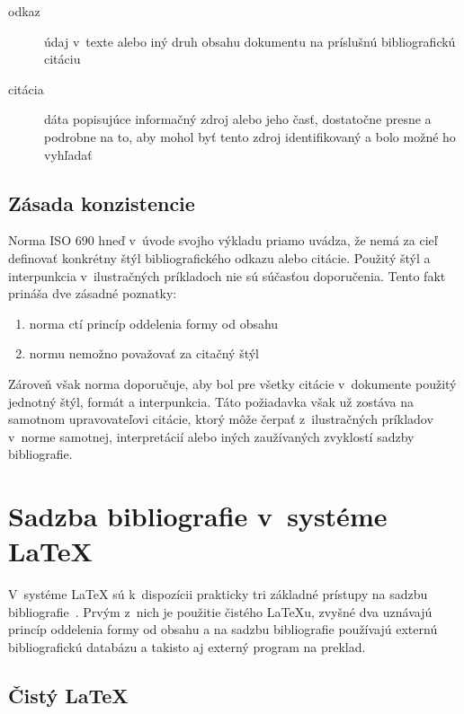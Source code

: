 \documentclass{csbulletin}
\begin{document}
\begin{refsection}
\begin{description}
\item[odkaz] údaj v~texte alebo iný druh obsahu dokumentu na
  príslušnú bibliografickú citáciu
\item[citácia] dáta popisujúce informačný zdroj alebo jeho časť,
  dostatočne presne a podrobne na to, aby mohol byť tento zdroj
  identifikovaný a bolo možné ho vyhľadať
\end{description}

\subsection{Zásada konzistencie}

Norma ISO 690 hneď v~úvode svojho výkladu priamo uvádza, že nemá za
cieľ definovať konkrétny štýl bibliografického odkazu alebo citácie.
Použitý štýl a interpunkcia v~ilustračných príkladoch nie sú súčasťou
doporučenia. Tento fakt prináša dve zásadné poznatky:

\begin{enumerate}
\item norma ctí princíp oddelenia formy od obsahu
\item normu nemožno považovať za citačný štýl~\cite{Hala2013}
\end{enumerate}

\noindent Zároveň však norma doporučuje, aby bol pre všetky citácie
v~dokumente použitý jednotný štýl, formát a interpunkcia. Táto
požiadavka však už zostáva na samotnom upravovateľovi citácie, ktorý
môže čerpať z~ilustračných príkladov v~norme samotnej, interpretácií
alebo iných zaužívaných zvyklostí sadzby bibliografie.


\section{Sadzba bibliografie v~systéme \LaTeX{}}

V~systéme \LaTeX{} sú k~dispozícii prakticky tri základné prístupy na
sadzbu bibliografie~\cite{talbot2013}. Prvým z~nich je použitie
čistého \LaTeX{}u, zvyšné dva uznávajú princíp oddelenia formy od
obsahu a na sadzbu bibliografie používajú externú bibliografickú
databázu a takisto aj externý program na preklad.

\subsection{Čistý \LaTeX}\label{bib:pure:latex}


\end{refsection}
\end{document}
